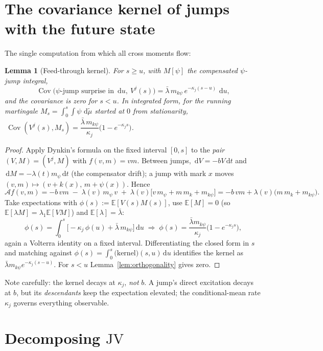 \documentclass[11pt]{report}
\newtheorem{lemma}[theorem]{Lemma}
\theoremstyle{definition}
\theoremstyle{remark}
\newcommand{\E}{\mathbb{E}}
\newcommand{\Cov}{\operatorname{Cov}}
\newcommand{\A}{\mathcal{A}}
\newcommand{\dd}{\,\mathrm{d}}
\newcommand{\Vj}{V^{j}}
\newcommand{\JV}{\mathrm{JV}}
\newcommand{\mk}{m_{k}}
\begin{document}
\section{The covariance kernel of jumps with the future state}

The single computation from which all cross moments flow:

\begin{lemma}[Feed-through kernel]\label{lem:kernel}
For $s\ge u$, with $M[\psi]$ the compensated $\psi$-jump integral,
\[
\Cov\!\big(\psi\text{-jump surprise in }\dd u,\ \Vj(s)\big)
=\bar\lambda\,m_{k\psi}\,e^{-\kappa_{j}(s-u)}\,\dd u ,
\]
and the covariance is zero for $s<u$. In integrated form, for the running
martingale $M_{s}=\int_{0}^{s}\!\int\psi\,\dd\tilde\mu$ started at $0$ from
stationarity,
$\ \Cov(\Vj(s),M_{s})
=\dfrac{\bar\lambda\,m_{k\psi}}{\kappa_{j}}\big(1-e^{-\kappa_{j}s}\big)$.
\end{lemma}

\begin{proof}
Apply Dynkin's formula on the fixed interval $[0,s]$ to the \emph{pair}
$(V,M)=(\Vj,M)$ with $f(v,m)=vm$. Between jumps, $\dd V=-bV\dd t$ and
$\dd M=-\lambda(t)m_{\psi}\dd t$ (the compensator drift); a jump with mark
$x$ moves $(v,m)\mapsto(v+k(x),\,m+\psi(x))$. Hence
\[
\A f(v,m) = -b\,vm \;-\;\lambda(v)\,m_{\psi}\,v
\;+\;\lambda(v)\big[v\,m_{\psi}+m\,\mk+m_{k\psi}\big]
= -b\,vm+\lambda(v)\big(m\,\mk+m_{k\psi}\big).
\]
Take expectations with $\phi(s):=\E[V(s)M(s)]$, use $\E[M]=0$ (so
$\E[\lambda M]=\lambda_{1}\E[VM]$) and $\E[\lambda]=\bar\lambda$:
\[
\phi(s)=\int_{0}^{s}\!\big[-\kappa_{j}\,\phi(u)
+\bar\lambda\,m_{k\psi}\big]\dd u
\;\Longrightarrow\;
\phi(s)=\frac{\bar\lambda m_{k\psi}}{\kappa_{j}}\big(1-e^{-\kappa_{j}s}\big),
\]
again a Volterra identity on a fixed interval. Differentiating the closed
form in $s$ and matching against
$\phi(s)=\int_{0}^{s}\text{(kernel)}(s,u)\dd u$ identifies the kernel as
$\bar\lambda m_{k\psi}e^{-\kappa_j(s-u)}$. For $s<u$
Lemma~\ref{lem:orthogonality} gives zero.
\end{proof}

Note carefully: the kernel decays at $\kappa_{j}$, \emph{not} $b$. A jump's
direct excitation decays at $b$, but its \emph{descendants} keep the
expectation elevated; the conditional-mean rate $\kappa_j$ governs
everything observable.

\section{Decomposing \texorpdfstring{$\JV$}{JV}}
\end{document}
